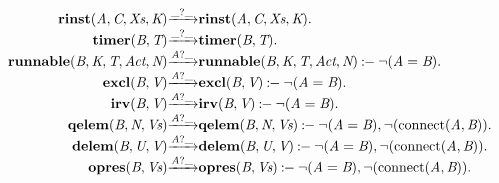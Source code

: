 \[
\begin{array}{r@{}c@{}l}
\\\Pfact{\Tstep{\Trinst{\Tvar{A}}{\Tvar{C}}{\Tvar{Xs}}{\Tvar{K}}}{\Thear{\_}{\_}}{\Trinst{\Tvar{A}}{\Tvar{C}}{\Tvar{Xs}}{\Tvar{K}}}}.
\\\Pfact{\Tstep{\Ttimer{\Tvar{B}}{\Tvar{T}}}{\Thear{\_}{\_}}{\Ttimer{\Tvar{B}}{\Tvar{T}}}}.
\\\Prule{\Tstep{\Trunnable{\Tvar{B}}{\Tvar{K}}{\Tvar{T}}{\Tvar{Act}}{\Tvar{N}}}{\Thear{\Tvar{A}}{\_}}{\Trunnable{\Tvar{B}}{\Tvar{K}}{\Tvar{T}}{\Tvar{Act}}{\Tvar{N}}}}{\Pnegate{\Tequal{\Tvar{A}}{\Tvar{B}}}}.
\\\Prule{\Tstep{\Texcl{\Tvar{B}}{\Tvar{V}}}{\Thear{\Tvar{A}}{\_}}{\Texcl{\Tvar{B}}{\Tvar{V}}}}{\Pnegate{\Tequal{\Tvar{A}}{\Tvar{B}}}}.
\\\Prule{\Tstep{\Tirv{\Tvar{B}}{\Tvar{V}}}{\Thear{\Tvar{A}}{\_}}{\Tirv{\Tvar{B}}{\Tvar{V}}}}{\Pnegate{\Tequal{\Tvar{A}}{\Tvar{B}}}}.
\\\Prule{\Tstep{\Tqelem{\Tvar{B}}{\Tvar{N}}{\Tvar{Vs}}}{\Thear{\Tvar{A}}{\_}}{\Tqelem{\Tvar{B}}{\Tvar{N}}{\Tvar{Vs}}}}{\Pnegate{\Tequal{\Tvar{A}}{\Tvar{B}}},\Pnegate{\Tconnect{\Tvar{A}}{\Tvar{B}}}}.
\\\Prule{\Tstep{\Tdelem{\Tvar{B}}{\Tvar{U}}{\Tvar{V}}}{\Thear{\Tvar{A}}{\_}}{\Tdelem{\Tvar{B}}{\Tvar{U}}{\Tvar{V}}}}{\Pnegate{\Tequal{\Tvar{A}}{\Tvar{B}}},\Pnegate{\Tconnect{\Tvar{A}}{\Tvar{B}}}}.
\\\Prule{\Tstep{\Topres{\Tvar{B}}{\Tvar{Vs}}}{\Thear{\Tvar{A}}{\_}}{\Topres{\Tvar{B}}{\Tvar{Vs}}}}{\Pnegate{\Tequal{\Tvar{A}}{\Tvar{B}}},\Pnegate{\Tconnect{\Tvar{A}}{\Tvar{B}}}}.
\\\end{array}
\]
